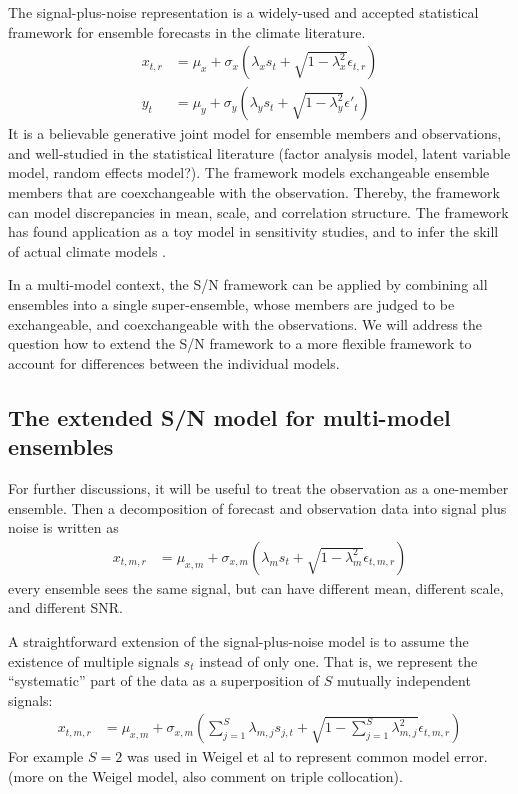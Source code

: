 \documentclass[12pt]{article}
\begin{document}
The signal-plus-noise representation is a widely-used and accepted statistical framework for ensemble forecasts in the climate literature. 
%
\begin{align}
x_{t,r} & = \mu_x + \sigma_x(\lambda_x s_t + \sqrt{1-\lambda_x^2} \epsilon_{t,r})\\
y_t & = \mu_y + \sigma_y(\lambda_y s_t + \sqrt{1-\lambda_y^2} \epsilon'_t)
\end{align}
%
It is a believable generative joint model for ensemble members and observations, and well-studied in the statistical literature (factor analysis model, latent variable model, random effects model?). 
The framework models exchangeable ensemble members that are coexchangeable with the observation. 
Thereby, the framework can model discrepancies in mean, scale, and correlation structure. 
The framework has found application as a toy model in sensitivity studies, and to infer the skill of actual climate models \cite{kharin, kumar, siegert}.


In a multi-model context, the S/N framework can be applied by combining all ensembles into a single super-ensemble, whose members are judged to be exchangeable, and coexchangeable with the observations.
We will address the question how to extend the S/N framework to a more flexible framework to account for differences between the individual models.






\subsection{The extended S/N model for multi-model ensembles}

For further discussions, it will be useful to treat the observation as a one-member ensemble.
Then a decomposition of forecast and observation data into signal plus noise is written as
%
\begin{align}
x_{t,m,r} & = \mu_{x,m} + \sigma_{x,m}(\lambda_m s_t + \sqrt{1-\lambda_m^2} \epsilon_{t,m,r})
\end{align}
%
every ensemble sees the same signal, but can have different mean, different scale, and different SNR.



A straightforward extension of the signal-plus-noise model is to assume the existence of multiple signals $s_t$ instead of only one. 
That is, we represent the ``systematic'' part of the data as a superposition of $S$ mutually independent signals:
%
\begin{align}
x_{t,m,r} & = \mu_{x,m} + \sigma_{x,m}\left(\sum_{j=1}^S \lambda_{m,j} s_{j,t} + \sqrt{1-\sum_{j=1}^S \lambda_{m,j}^2} \epsilon_{t,m,r}\right)
\end{align}
%
For example $S=2$ was used in Weigel et al to represent common model error. (more on the Weigel model, also comment on triple collocation).
\end{document}
